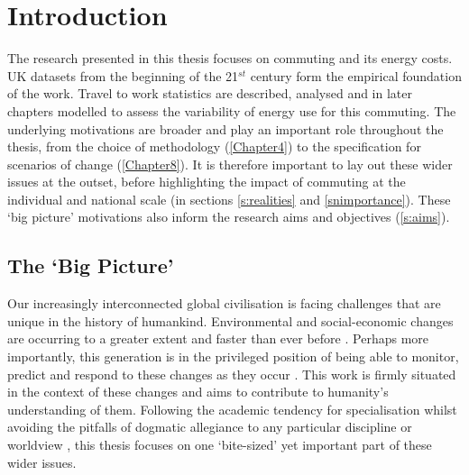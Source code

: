 
\chapter{Introduction} %
\label{Chapter1}
\fancyhead[RE,LO]{\thepage}
The research presented in this thesis focuses on commuting and its energy costs.
UK datasets from the beginning of the 21$^{st}$ century form the empirical
foundation of the work. Travel to work statistics are described, analysed and in later
chapters modelled to assess the variability of energy use for this commuting.
The underlying motivations are broader and play an important role
throughout the thesis, from the choice of methodology (\cref{Chapter4}) to the
specification for scenarios of change (\cref{Chapter8}).
It is therefore important to lay out these wider issues at the outset, before
highlighting the impact of commuting at the individual and national scale (in
sections \ref{s:realities} and \ref{snimportance}). These `big picture'
motivations also inform the research aims and objectives (\cref{s:aims}).

\section{The `Big Picture'}
Our increasingly interconnected global civilisation is facing challenges
that are unique in the history of humankind. Environmental
and social-economic changes are occurring to a greater extent and faster
than ever before \citep{Rifkin2011a, ehrlich2013can}. Perhaps more
importantly, this generation is in the privileged position of being able to monitor,
predict and respond to these changes as they occur \citep{Evans1998,
Smil2008, IPCC2007}.
This work is firmly situated in the context of these changes and aims to
contribute to humanity's understanding of them.
Following the academic tendency for specialisation
 whilst avoiding the pitfalls of dogmatic allegiance to any particular
discipline or worldview \citep{kates1986geography},
this thesis focuses on one `bite-sized' yet important part of these wider
issues.

